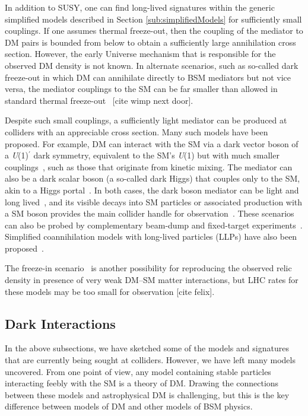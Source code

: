 \documentclass{ar-1col}
\begin{document}
In addition to SUSY, one can find long-lived signatures within the
generic simplified models described in Section \ref{sub:simplifiedModels}
for sufficiently small couplings. If one assumes thermal freeze-out, then the
coupling of the mediator to DM pairs is bounded from below to
obtain a sufficiently large annihilation cross section. However,
the early Universe mechanism that is
responsible for the observed DM density is not known. 
In alternate scenarios,
such as so-called dark freeze-out in which DM can annihilate directly to
BSM mediators but not vice versa, the mediator couplings to the SM
can be far smaller than allowed in standard thermal freeze-out~\cite{Pospelov:2007mp,Das:2010ts} [cite wimp next door]. 

Despite such small couplings, a
sufficiently light mediator can be produced at colliders with
an appreciable cross section. Many such models have been proposed. For example, DM can interact with the SM via a dark
vector boson of a \textit{U}(1)$^{\prime}$ dark symmetry, equivalent to the SM's \textit{U}(1)
but with much smaller couplings~\cite{Holdom:1985ag}, such as
those that originate from kinetic mixing. The mediator can also be a
dark scalar boson (a so-called dark Higgs) that couples only to the SM,
akin to a Higgs portal~\cite{Curtin:2014cca}. In both cases, the
dark boson mediator can be light and
long lived~\cite{Pospelov:2007mp}, and its visible decays into SM
particles or associated production with a SM boson provides the
main collider handle for observation~\cite{Curtin:2014cca}. These
scenarios can also be probed by complementary beam-dump and fixed-target experiments~\cite{Battaglieri:2017aum}. Simplified
coannihilation models with long-lived particles (LLPs) have also been
proposed~\cite{ElHedri:2017nny}.

The freeze-in
scenario~\cite{Co:2015pka,Bernal:2017kxu} is another possibility
for reproducing the observed relic density in presence of very weak DM--SM matter interactions,
but LHC rates for these models may be too small for observation [cite felix]. 

\subsection{Dark Interactions}\label{sec:darkint}

In the above subsections, we have sketched some of the models and signatures
that are currently being sought at colliders. However, we have left many models uncovered. From one
point of view, any model containing stable particles interacting
feebly with the SM is a theory of DM. Drawing the connections
between these models and astrophysical DM is challenging, but this
is the key difference between models of DM and other models of BSM
physics.
\end{document}
